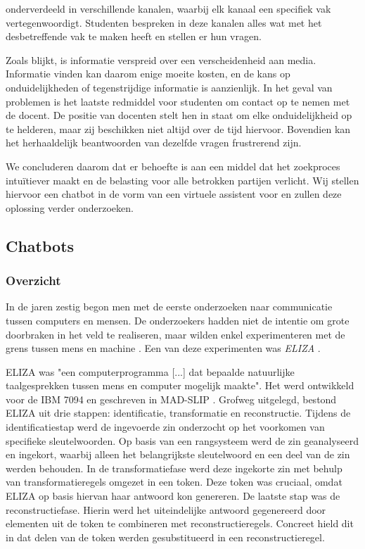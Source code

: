 onderverdeeld in verschillende kanalen, waarbij elk kanaal een specifiek vak vertegenwoordigt. Studenten bespreken in deze kanalen alles wat met het desbetreffende vak te maken heeft en stellen er hun vragen.

Zoals blijkt, is informatie verspreid over een verscheidenheid aan media. Informatie vinden kan daarom enige moeite kosten, en de kans op onduidelijkheden of tegenstrijdige informatie is aanzienlijk. In het geval van problemen is het laatste redmiddel voor studenten om contact op te nemen met de docent. De positie van docenten stelt hen in staat om elke onduidelijkheid op te helderen, maar zij beschikken niet altijd over de tijd hiervoor. Bovendien kan het herhaaldelijk beantwoorden van dezelfde vragen frustrerend zijn.

We concluderen daarom dat er behoefte is aan een middel dat het zoekproces intuïtiever maakt en de belasting voor alle betrokken partijen verlicht. Wij stellen hiervoor een chatbot in de vorm van een virtuele assistent voor en zullen deze oplossing verder onderzoeken.

\subsection{Chatbots}
\label{sec:chatbots}

\subsubsection{Overzicht}

In de jaren zestig begon men met de eerste onderzoeken naar communicatie tussen computers en mensen. De onderzoekers hadden niet de intentie om grote doorbraken in het veld te realiseren, maar wilden enkel experimenteren met de grens tussen mens en machine \autocite{Dibitonto2018, AbuShawar2007}. Een van deze experimenten was \textit{ELIZA} \autocite{Weizenbaum1966}.

ELIZA was "een computerprogramma [...] dat bepaalde natuurlijke taalgesprekken tussen mens en computer mogelijk maakte". Het werd ontwikkeld voor de IBM 7094 en geschreven in MAD-SLIP \autocite{Weizenbaum1966}. Grofweg uitgelegd, bestond ELIZA uit drie stappen: identificatie, transformatie en reconstructie.
Tijdens de identificatiestap werd de ingevoerde zin onderzocht op het voorkomen van specifieke sleutelwoorden. Op basis van een rangsysteem werd de zin geanalyseerd en ingekort, waarbij alleen het belangrijkste sleutelwoord en een deel van de zin werden behouden. In de transformatiefase werd deze ingekorte zin met behulp van transformatieregels omgezet in een token. Deze token was cruciaal, omdat ELIZA op basis hiervan haar antwoord kon genereren. De laatste stap was de reconstructiefase. Hierin werd het uiteindelijke antwoord gegenereerd door elementen uit de token te combineren met reconstructieregels. Concreet hield dit in dat delen van de token werden gesubstitueerd in een reconstructieregel.

